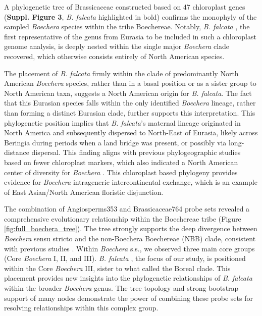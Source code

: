\documentclass[9pt,twocolumn,twoside,lineno]{gsag3jnl}
\begin{document}
A phylogenetic tree of Brassicaceae constructed based on 47 chloroplast genes (\textbf{Suppl. Figure 3}, \textit{B. falcata} highlighted in bold) confirms the monophyly of the sampled \textit{Boechera} species within the tribe Boechereae. Notably, \textit{B. falcata} , the first representative of the genus from Eurasia to be included in such a chloroplast genome analysis, is deeply nested within the single major \textit{Boechera} clade recovered, which otherwise consists entirely of North American species.

The placement of \textit{B. falcata} firmly within the clade of predominantly North American \textit{Boechera} species, rather than in a basal position or as a sister group to North American taxa, suggests a North American origin for \textit{B. falcata}. The fact that this Eurasian species falls within the only identified \textit{Boechera} lineage, rather than forming a distinct Eurasian clade, further supports this interpretation. This phylogenetic position implies that \textit{B. falcata}'s maternal lineage originated in North America and subsequently dispersed to North-East of Eurasia, likely across Beringia during periods when a land bridge was present, or possibly via long-distance dispersal. This finding aligns with previous phylogeographic studies based on fewer chloroplast markers, which also indicated a North American center of diversity for \textit{Boechera} \citep{dobevs2004extensive, dobevs2004intraspecific, kiefer2009phylogeographic}. This chloroplast based phylogeny provides evidence for \textit{Boechera} intrageneric intercontinental exchange, which is an example of East Asian/North American floristic disjunction.

The combination of Angiosperms353 and Brassicaceae764 probe sets revealed a comprehensive evolutionary relationship within the Boechereae tribe (Figure \ref{fig:full_boechera_tree}). The tree strongly supports the deep divergence between \textit{Boechera} sensu stricto and the non-Boechera Boechereae (NBB) clade, consistent with previous studies \citep{hay2023}. Within \textit{Boechera} s.s., we observed three main core groups (Core \textit{Boechera} I, II, and III). \textit{B. falcata} , the focus of our study, is positioned within the Core \textit{Boechera} III, sister to what \citep{hay2023} called the Boreal clade. This placement provides new insights into the phylogenetic relationships of \textit{B. falcata} within the broader \textit{Boechera} genus. The tree topology and strong bootstrap support of many nodes demonstrate the power of combining these probe sets for resolving relationships within this complex group.
\end{document}
